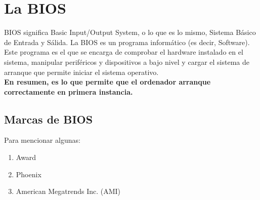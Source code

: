 \section{La BIOS}\label{sec:bios}

	BIOS significa Basic Input/Output System, o lo que es lo mismo, Sistema
	Básico de Entrada y Sálida. La BIOS es un programa informático (es decir,
	Software). \\
	Este programa es el que se encarga de comprobar el hardware
	instalado en el sistema, manipular periféricos y dispositivos a bajo nivel
	y cargar el sistema de arranque que permite iniciar el sistema operativo. \\
	{\bf En resumen, es lo que permite que el ordenador arranque correctamente en
	primera instancia.}

		
		
		

			
	\subsection{Marcas de BIOS}\label{sub:marcas de bios}
		Para mencionar algunas:
		\begin{enumerate}
			\item Award
			\item Phoenix
			\item American Megatrends Inc. (AMI)
		\end{enumerate}
	

